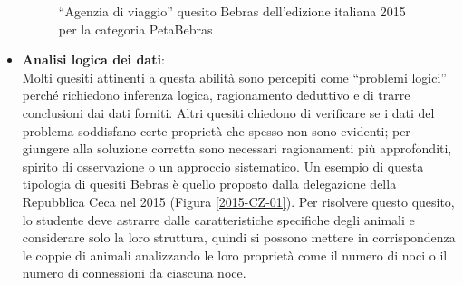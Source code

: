 \documentclass[12pt]{report}
\begin{document}
\begin{itemize}
		\begin{figure}[h]
		\centering
		\caption{``Agenzia di viaggio'' quesito Bebras dell'edizione italiana 2015 per la categoria PetaBebras}\label{agenzia_viaggio}
	\end{figure}

\bigskip	
	\item \textbf{Analisi logica dei dati}: 
	\\
	Molti quesiti attinenti a questa abilità sono percepiti come ``problemi logici'' perché richiedono inferenza logica, ragionamento deduttivo e di trarre conclusioni dai dati forniti.
	Altri quesiti chiedono di verificare se i dati del problema soddisfano certe proprietà che spesso non sono evidenti; per giungere alla soluzione corretta sono necessari ragionamenti più approfonditi, spirito di osservazione o un approccio sistematico.
	Un esempio di questa tipologia di quesiti Bebras è quello proposto dalla delegazione della Repubblica Ceca nel 2015 (Figura \ref{2015-CZ-01}). Per risolvere questo quesito, lo studente deve astrarre dalle caratteristiche specifiche degli animali e considerare solo la loro struttura, quindi si possono mettere in corrispondenza le coppie di animali analizzando le loro proprietà come il numero di noci o il numero di connessioni da ciascuna noce.
	

\end{itemize}
\end{document}
